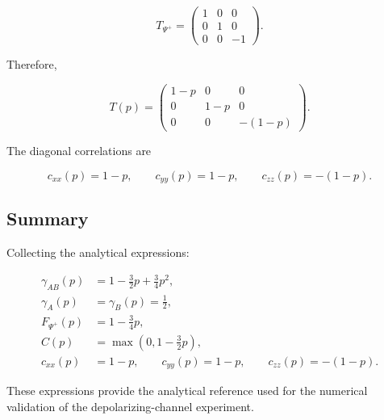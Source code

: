 \[
T_{\Psi^+}
=
\begin{pmatrix}
1 & 0 & 0 \\
0 & 1 & 0 \\
0 & 0 & -1
\end{pmatrix}.
\]

Therefore,

\begin{equation}
T(p)
=
\begin{pmatrix}
1-p & 0 & 0 \\
0 & 1-p & 0 \\
0 & 0 & -(1-p)
\end{pmatrix}.
\label{eq:appendix_depolarizing_tensor}
\end{equation}

The diagonal correlations are

\begin{equation}
c_{xx}(p)
=
1-p,
\qquad
c_{yy}(p)
=
1-p,
\qquad
c_{zz}(p)
=
-(1-p).
\label{eq:appendix_depolarizing_diagonal_correlations}
\end{equation}


\subsection*{Summary}

Collecting the analytical expressions:

\[
\boxed{
\begin{aligned}
\gamma_{AB}(p)
&=
1-\frac{3}{2}p+\frac{3}{4}p^2,
\\
\gamma_A(p)
&=
\gamma_B(p)
=
\frac{1}{2},
\\
F_{\Psi^+}(p)
&=
1-\frac{3}{4}p,
\\
C(p)
&=
\max
\left(
0,
1-\frac{3}{2}p
\right),
\\
c_{xx}(p)
&=
1-p,
\qquad
c_{yy}(p)
=
1-p,
\qquad
c_{zz}(p)
=
-(1-p).
\end{aligned}
}
\]

These expressions provide the analytical reference used for the numerical validation of the depolarizing-channel experiment.